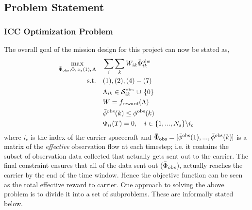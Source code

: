\documentclass[12pt]{article}
\begin{document}

\subsection*{Problem Statement}
\subsubsection*{ICC Optimization Problem}
The overall goal of the mission design for this project can now be stated as,
\begin{equation}
\begin{aligned}
\max_{\bar{\Phi}_{\rm obs}, \Phi,\, x_{{\rm s}}(1),\, \Lambda} \quad & \sum_i\sum_k W_{ik}\bar{\Phi}_{ik}^{\rm obs}\\
\textrm{s.t.} \quad & (1),(2),(4)-(7)  \\
& \Lambda_{ik}\in \mathcal{S}^{\rm obs}_{ik} \, \cup \, \{0\} \\ 
& W = f_{\rm reward}(\Lambda) \\
& \bar{\phi}^{\rm obs}(k) \leq \phi^{\rm obs}(k) \\
& \Phi_{ii}(T) = 0,\quad i\in\{1,...,N_s\}\backslash i_c
\end{aligned}
\end{equation}
where $i_c$ is the index of the carrier spacecraft and $\bar{\Phi}_{\rm obs} = [\bar{\phi}^{\rm obs}(1), ..., \bar{\phi}^{\rm obs}(k)]$ is a matrix of the \textit{effective} observation flow at each timestep; i.e. it contains the subset of observation data collected that actually gets sent out to the carrier. The final constraint ensures that all of the data sent out ($\bar{\Phi}_{\rm obs}$), actually reaches the carrier by the end of the time window. Hence the objective function can be seen as the total effective reward to carrier. 
One approach to solving the above problem is to divide it into a set of subproblems. These are informally stated below. 
\end{document}

